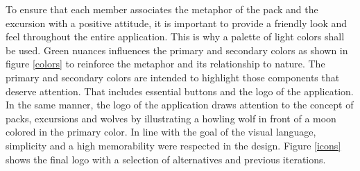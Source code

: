 \documentclass[12pt,numbers=noenddot,parskip,bibliography=totocnumbered,listof=totocnumbered]{scrreprt}
\begin{document}
To ensure that each member associates the metaphor of the pack and the excursion with a positive attitude, it is important to provide a friendly look and feel throughout the entire application. This is why a palette of light colors shall be used. Green nuances influences the primary and secondary colors as shown in figure \ref{colors} to reinforce the metaphor and its relationship to nature. The primary and secondary colors are intended to highlight those components that deserve attention. That includes essential buttons and the logo of the application. In the same manner, the logo of the application draws attention to the concept of packs, excursions and wolves by illustrating a howling wolf in front of a moon colored in the primary color. In line with the goal of the visual language, simplicity and a high memorability were respected in the design. Figure \ref{icons} shows the final logo with a selection of alternatives and previous iterations.
 
\end{document}
